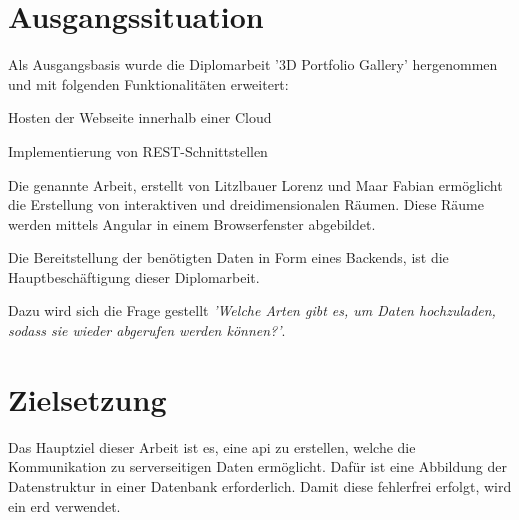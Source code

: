 \section{Ausgangssituation}
Als Ausgangsbasis wurde die Diplomarbeit '3D Portfolio Gallery' hergenommen und mit folgenden Funktionalitäten erweitert:

\begin{compactitem}
    \item Hosten der Webseite innerhalb einer Cloud
    \item Implementierung von REST-Schnittstellen 
\end{compactitem}

Die genannte Arbeit, erstellt von Litzlbauer Lorenz und Maar Fabian 
ermöglicht die Erstellung von interaktiven und dreidimensionalen Räumen.
Diese Räume werden mittels Angular in einem Browserfenster abgebildet.


Die Bereitstellung der benötigten Daten in Form eines Backends, ist die Hauptbeschäftigung dieser Diplomarbeit.

Dazu wird sich die Frage gestellt \textit{'Welche Arten gibt es, um Daten hochzuladen, sodass sie wieder abgerufen werden können?'}.


\section{Zielsetzung}

Das Hauptziel dieser Arbeit ist es, eine \Gls{api} zu erstellen, welche die Kommunikation zu serverseitigen Daten ermöglicht. 
Dafür ist eine Abbildung der Datenstruktur in einer Datenbank erforderlich. 
Damit diese fehlerfrei erfolgt, wird ein \Gls{erd} verwendet. 